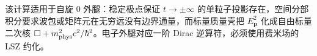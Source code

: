 \begin{derivation}
该计算适用于自旋 $0$ 外腿：稳定极点保证 $t\to\pm\infty$ 的单粒子投影存在，空间分部积分要求波包或矩阵元在无穷远没有边界通量，而标量质量壳把 $E_{\mathbf p}^2$ 化成自由标量二次核 $\Box+m_{\rm phys}^2c^2/\hbar^2$。电子外腿对应一阶 Dirac 逆算符，必须使用费米场的 LSZ 约化。
\end{derivation}
